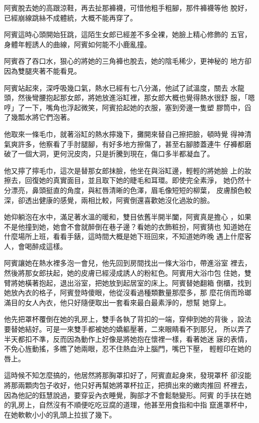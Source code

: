 阿賓脫去她的高跟涼鞋，再去扯那褲襪，可惜他粗手粗腳，那件褲襪等他
脫好，已經崩線跳絲不成體統，大概不能再穿了。

阿賓這時心頭開始狂跳，這陌生女郎已經差不多全裸，她臉上精心修飾的
五官，身體年輕誘人的曲線，阿賓如何能不小鹿亂撞。

阿賓吞了吞口水，狠心的將她的三角褲也脫去，她的陰毛稀少，更神秘的
地方卻因為雙腿夾著不能看見。

阿賓站起來，深呼吸幾口氣，熱水已經有七八分滿，他試了試溫度，關去
水龍頭，然後彎腰抱起那女郎，將她放進浴缸裡，那女郎大概也覺得熱水很舒
服，「嗯哼」了一下，嘴角也浮起微笑，阿賓拾起她的衣服，塞到旁邊一隻塑
膠筒中，舀了幾瓢水將它們泡著。

他取來一條毛巾，就著浴缸的熱水擰幾下，攤開來替自己擦把臉，頓時覺
得神清氣爽許多，他察看了手肘腿腳，有好多地方擦傷了，甚至右腳膝蓋連牛
仔褲都磨破了一個大洞，更何況皮肉，只是折騰到現在，傷口多半都凝血了。

他又擰了擰毛巾，這次是替那女郎抹臉，他坐在與浴缸邊，輕輕的將她臉
上的妝擦去，回復她的真實面目，並且取下她的睫毛和耳環。即使完全素淨，
她仍然十分漂亮，鼻頭挺直的角度，與紅唇清晰的色澤，眉毛像短短的柳葉，
皮膚顏色較深，卻透出健康的感覺，兩相比較，阿賓倒還喜歡她沒化過妝的臉。

她仰躺泡在水中，滿足著水溫的暖和，雙目依舊半開半闔，阿賓真是擔心
，如果不是他撞到她，她會不會就醉倒在巷子邊？看她的衣飾粧扮，阿賓猜也
知道她在什麼場所上班，看看手錶，這時間大概是她下班回來，不知道她昨晚
遇上什麼客人，會喝醉成這樣。

阿賓讓她在熱水裡多泡一會兒，他先回到房間找出一條大浴巾，帶進浴室
裡去，然後將那女郎扶起，她的皮膚已經浸成誘人的粉紅色。阿賓用大浴巾包
住她，雙臂將她橫著抱起，退出浴室，把她放到起居室的床上。阿賓替她翻箱
倒櫃，找到她放內衣的格子，阿賓登時傻眼，他從沒看過種類數量那麼多，那
麼花俏而玲瑯滿目的女人內衣，他只好隨便取出一套看來最白最素淨的，想幫
她穿上。

他先把罩杯覆倒在她的乳房上，雙手各執了背扣的一端，穿伸到她的背後
，設法要替她結好。可是一來雙手都被她的嬌軀壓著，二來眼睛看不到那兒，
所以弄了半天都扣不準，反而因為動作上好像是將她抱在懷裡一樣，看著她迷
寐的表情，不免心旌動搖，多瞧了她兩眼，忍不住熱血沖上腦門，嘴巴下壓，
輕輕印在她的唇上。

這時候不知怎麼搞的，他居然將那胸罩扣好了，阿賓直起身來，發現罩杯
卻沒能將那兩顆肉包子收好，他只好再幫她將罩杯拉正，把擠出來的嫩肉推回
杯裡去，因為他記的鈺慧說過，要穿妥內衣睡覺，胸部才不會鬆馳變形。阿賓
的手扶在她的乳房上，自然沒有不順便吃吃豆腐的道理，他甚至用食指和中指
竄進罩杯中，在她軟軟小小的乳頭上拉拔了幾下。

